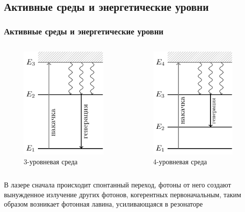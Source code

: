 \documentclass[10pt,pdf,hyperref={unicode}, dvipsnames]{beamer}
\newcommand\frametitless[1]{\subsection{#1}\frametitle{#1}}
\begin{document}
\begin{frame}[t]
	\frametitless{Активные среды и энергетические уровни}

	\begin{columns}
		\begin{column}{0.49\textwidth}
			\begin{figure}[h]
				\centering
				\includegraphics[]{images/3nd}
				\caption{3-уровневая среда}
			\end{figure}	
		\end{column}
		\begin{column}{0.49\textwidth}
			\begin{figure}[h]
				\centering
				\includegraphics[]{images/4nd}
				\caption{4-уровневая среда}
			\end{figure}	
		\end{column}
	\end{columns}

	В лазере сначала происходит спонтанный переход, фотоны от него создают вынужденное излучение других фотонов, когерентных первоначальным, таким образом возникает фотонная лавина, усиливающаяся в резонаторе

\end{frame}
\end{document}
